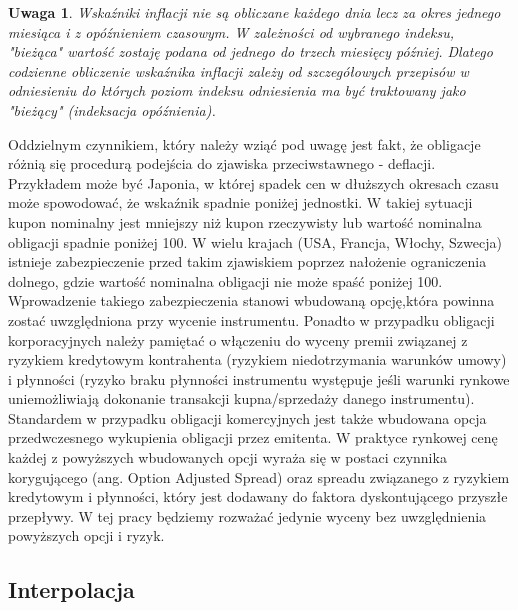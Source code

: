 \documentclass{mini}
\theoremstyle{mythstyle}
\newtheorem{Uwaga}{Uwaga}[chapter]
\begin{document}
	\begin{Uwaga}
		Wskaźniki inflacji nie są obliczane każdego dnia lecz za okres jednego miesiąca i z opóźnieniem czasowym. W zależności od wybranego indeksu, "bieżąca" wartość zostaję podana od jednego do trzech miesięcy później. Dlatego codzienne obliczenie wskaźnika inflacji zależy od szczegółowych przepisów w odniesieniu do których poziom indeksu odniesienia ma być traktowany jako "bieżący" (indeksacja opóźnienia).
	\end{Uwaga}		
	Oddzielnym czynnikiem, który należy wziąć pod uwagę jest fakt, że obligacje różnią się procedurą podejścia do zjawiska przeciwstawnego - deflacji. Przykładem może być Japonia, w której spadek cen w dłuższych okresach czasu może spowodować, że wskaźnik spadnie poniżej jednostki. W takiej sytuacji kupon nominalny jest mniejszy niż kupon rzeczywisty lub wartość nominalna obligacji spadnie poniżej 100. W wielu krajach (USA, Francja, Włochy, Szwecja) istnieje zabezpieczenie przed takim zjawiskiem poprzez nałożenie ograniczenia dolnego, gdzie wartość nominalna obligacji nie może spaść poniżej 100. Wprowadzenie takiego zabezpieczenia stanowi wbudowaną opcję,która powinna zostać uwzględniona przy wycenie instrumentu. Ponadto w przypadku obligacji korporacyjnych należy pamiętać o włączeniu do wyceny premii związanej z ryzykiem kredytowym kontrahenta (ryzykiem niedotrzymania warunków umowy) i płynności (ryzyko braku płynności instrumentu występuje jeśli warunki rynkowe uniemożliwiają dokonanie transakcji kupna/sprzedaży danego instrumentu). Standardem w przypadku obligacji komercyjnych jest także wbudowana opcja przedwczesnego wykupienia obligacji przez emitenta. W praktyce rynkowej cenę każdej z powyższych wbudowanych opcji wyraża się w postaci czynnika korygującego (ang. Option Adjusted Spread) oraz  spreadu związanego z ryzykiem kredytowym i płynności, który jest dodawany do faktora dyskontującego przyszłe przepływy. W tej pracy będziemy rozważać jedynie wyceny bez uwzględnienia powyższych opcji i ryzyk.
			
	\subsection{Interpolacja}
	
\end{document}
